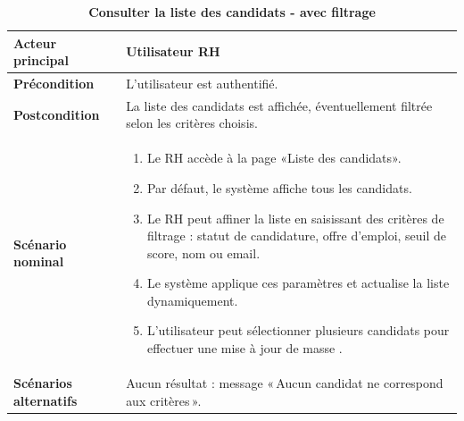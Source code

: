 \documentclass[12pt,a4paper,oneside]{report}
\begin{document}
\begin{itemize}
\begin{table}[H]
\centering
\caption{\textbf{Consulter la liste des candidats - avec filtrage}}
\vspace{0.3cm}
\begin{tabular}{|p{3.5cm}|p{11cm}|}
\hline
\textbf{Acteur principal} & Utilisateur RH \\
\hline
\textbf{Précondition} & L’utilisateur est authentifié. \\
\hline
\textbf{Postcondition} & La liste des candidats est affichée, éventuellement filtrée selon les critères choisis. \\
\hline
\textbf{Scénario nominal} &
\begin{minipage}[t]{10.5cm}
\begin{enumerate}
    \item Le RH accède à la page «Liste des candidats».
    \item Par défaut, le système affiche tous les candidats.
    \item Le RH peut affiner la liste en saisissant des critères de filtrage : statut de candidature, offre d’emploi, seuil de score, nom ou email.
    \item Le système applique ces paramètres et actualise la liste dynamiquement.
    \item L'utilisateur peut sélectionner plusieurs candidats pour effectuer une mise à jour de masse .
    \vspace{0.3cm}
\end{enumerate}
\end{minipage} \\
\hline
\textbf{Scénarios alternatifs} &
\begin{minipage}[t]{10.5cm}
Aucun résultat : message « Aucun candidat ne correspond aux critères ».
\end{minipage} \\
\hline
\end{tabular}
\end{table}





\end{itemize}
\end{document}

